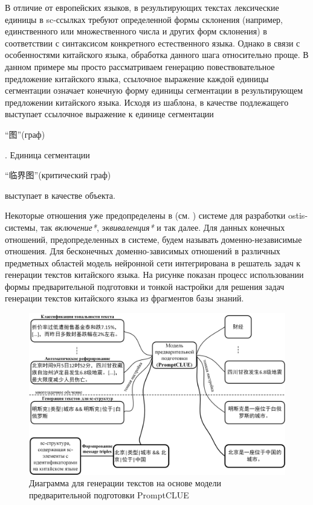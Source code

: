 В отличие от европейских языков, в результирующих текстах лексические единицы в sc-ссылках требуют определенной формы склонения (например, единственного или множественного числа и других форм склонения) в соответствии с синтаксисом конкретного естественного языка. Однако в связи с особенностями китайского языка, обработка данного шага относительно проще. В данном примере мы просто рассматриваем генерацию повествовательное предложение китайского языка, ссылочное выражение каждой единицы сегментации означает конечную форму единицы сегментации в результирующем предложении китайского языка. Исходя из шаблона, в качестве подлежащего выступает ссылочное выражение к единице сегментации \begin{CJK}{UTF8}{gbsn} ``图''(граф) \end{CJK}. Единица сегментации \begin{CJK}{UTF8}{gbsn} ``临界图''(критический граф) \end{CJK} выступает в качестве объекта. 

Некоторые отношения уже предопределены в  (см. ) системе для разработки ostis-системы, так \textit{включение*}, \textit{эквиваленция*} и так далее. Для данных конечных отношений, предопределенных в  системе, будем называть доменно-независимые отношения. Для бесконечных доменно-зависимых отношений в различных предметных областей модель нейронной сети интегрирована в решатель задач к генерации текстов китайского языка. На рисунке \textit{} показан процесс использовании формы предварительной подготовки и тонкой настройки для решения задач генерации текстов китайского языка из фрагментов базы знаний. 
\begin{figure}[H]
	\includegraphics[scale=0.8,width=1.0\textwidth]{images/part4/chapter_chinese/promptCLUE4SC.png}
	\caption{Диаграмма для генерации текстов на основе модели предварительной подготовки PromptCLUE}
	\label{fig:pre-training-model}
\end{figure}

